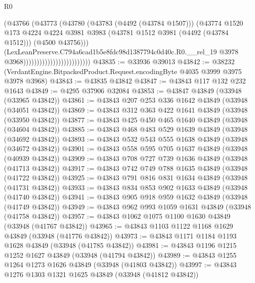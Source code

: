 \begin{lexlean}{R0}
\begin{coremodule}
                                                (@43766
                                                  (@43773
                                                    (@43780
                                                      (@43783 (@4492 (@43784 @1507)))
                                                      (@43774
                                                        @1520
                                                        @173
                                                        @4224
                                                        @4224
                                                        @3981
                                                        @3983
                                                        (@43781 @1512 @3981 (@4492 (@43784 @1512)))
                                                        (@4500 @43756)))
                                                    (LexLeanPreserve.C794a6cad1b5e8fdc98d1387794c0d40c.R0.__rel_19
                                                      @3978
                                                      @3968)))))))))))))))))))))))))
@43835 := @33936 @39013
@43842 := @38232 (VerdantEngine.BitpackedProduct.Request.encodingByte @4035 @3999 @3975 @3978 @3968)
@43843 := @43835 @43842
@43847 := @43843 @117 @132 @232 @1643
@43849 := @4295 @37906 @32084
@43853 := @43847 @43849 (@33948 (@33965 @43842))
@43861 := @43843 @207 @253 @336 @1642 @43849 (@33948 (@34051 @43842))
@43869 := @43843 @312 @363 @422 @1641 @43849 (@33948 (@33950 @43842))
@43877 := @43843 @425 @450 @465 @1640 @43849 (@33948 (@34604 @43842))
@43885 := @43843 @468 @483 @529 @1639 @43849 (@33948 (@34692 @43842))
@43893 := @43843 @532 @543 @555 @1638 @43849 (@33948 (@34672 @43842))
@43901 := @43843 @558 @595 @705 @1637 @43849 (@33948 (@40939 @43842))
@43909 := @43843 @708 @727 @739 @1636 @43849 (@33948 (@41713 @43842))
@43917 := @43843 @742 @749 @788 @1635 @43849 (@33948 (@41722 @43842))
@43925 := @43843 @791 @816 @831 @1634 @43849 (@33948 (@41731 @43842))
@43933 := @43843 @834 @853 @902 @1633 @43849 (@33948 (@41740 @43842))
@43941 := @43843 @905 @918 @959 @1632 @43849 (@33948 (@41749 @43842))
@43949 := @43843 @962 @993 @1059 @1631 @43849 (@33948 (@41758 @43842))
@43957 := @43843 @1062 @1075 @1100 @1630 @43849 (@33948 (@41767 @43842))
@43965 := @43843 @1103 @1122 @1168 @1629 @43849 (@33948 (@41776 @43842))
@43973 := @43843 @1171 @1184 @1193 @1628 @43849 (@33948 (@41785 @43842))
@43981 := @43843 @1196 @1215 @1252 @1627 @43849 (@33948 (@41794 @43842))
@43989 := @43843 @1255 @1264 @1273 @1626 @43849 (@33948 (@41803 @43842))
@43997 := @43843 @1276 @1303 @1321 @1625 @43849 (@33948 (@41812 @43842))

\end{coremodule}
\end{lexlean}
